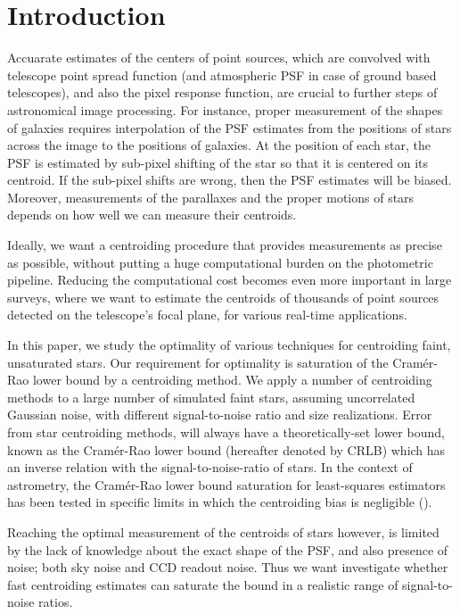 \documentclass[12pt, preprint]{aastex}
\begin{document}

\section{Introduction}

Accuarate estimates of the centers of point
sources, which are convolved with telescope point spread function (and atmospheric PSF in case of
ground based telescopes), and also the pixel response function, are crucial to further steps of
astronomical image processing. For instance, proper measurement of the shapes of galaxies
requires interpolation of the PSF estimates from the positions of stars across the
image to the positions of galaxies. At the position of each star, the PSF is estimated by sub-pixel 
shifting of the star so that it is centered on its centroid. If the sub-pixel shifts are wrong, then 
the PSF estimates will be biased. Moreover, measurements of the parallaxes and the proper motions of stars
depends on how well we can measure their centroids. 

Ideally, we want a centroiding procedure that provides measurements as precise as possible,
without putting a huge computational burden on the photometric pipeline.
Reducing the computational cost becomes even more important in large surveys,
where we want to estimate the centroids of thousands of point sources detected
on the telescope's focal plane, for various real-time applications.

In this paper, we study the optimality of various techniques for centroiding 
faint, unsaturated stars. Our requirement for optimality is saturation of the Cram\'{e}r-Rao 
lower bound by a centroiding method. We apply a number of centroiding methods 
to a large number of simulated faint stars, assuming uncorrelated Gaussian noise, 
with different signal-to-noise ratio and size realizations. Error from star 
centroiding methods, will always have a theoretically-set lower bound, 
known as the Cram\'{e}r-Rao lower bound (hereafter denoted by CRLB) which 
has an inverse relation with the signal-to-noise-ratio of stars. In the context 
of astrometry, the Cram\'{e}r-Rao lower bound saturation for least-squares 
estimators has been tested in specific limits in which the centroiding bias is 
negligible (\citealt{lobos}). 

Reaching the optimal measurement of the centroids of stars however, is limited
by the lack of knowledge about the exact shape of the PSF, and also presence of noise;
both sky noise and CCD readout noise. Thus we want investigate whether fast centroiding 
estimates can saturate the bound in a realistic range of signal-to-noise ratios.
\end{document}

